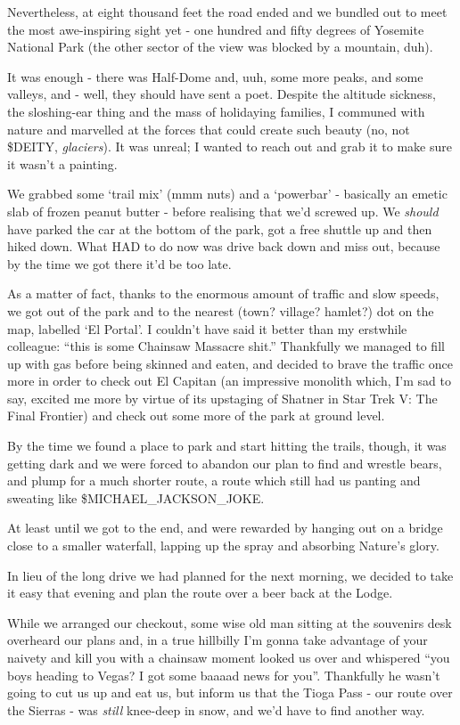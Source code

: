 \documentclass[a5paper,10pt,titlepage,draft]{book}
\begin{document}
Nevertheless, at eight thousand feet the road ended and we bundled out to meet the most awe-inspiring sight yet - one hundred and fifty degrees of Yosemite National Park (the other sector of the view was blocked by a mountain, duh).

It was enough - there was Half-Dome and, uuh, some more peaks, and some valleys, and - well, they should have sent a poet.  Despite the altitude sickness, the sloshing-ear thing and the mass of holidaying families, I communed with nature and marvelled at the forces that could create such beauty (no, not \$DEITY, \emph{glaciers}).  It was unreal; I wanted to reach out and grab it to make sure it wasn't a painting.

We grabbed some `trail mix' (mmm nuts) and a `powerbar' - basically an emetic slab of frozen peanut butter - before realising that we'd screwed up.  We \emph{should} have parked the car at the bottom of the park, got a free shuttle up and then hiked down.  What HAD to do now was drive back down and miss out, because by the time we got there it'd be too late.

As a matter of fact, thanks to the enormous amount of traffic and slow speeds, we got out of the park and to the nearest (town? village? hamlet?) dot on the map, labelled `El Portal'.  I couldn't have said it better than my erstwhile colleague: ``this is some Chainsaw Massacre shit.''  Thankfully we managed to fill up with gas before being skinned and eaten, and decided to brave the traffic once more in order to check out El Capitan (an impressive monolith which, I'm sad to say, excited me more by virtue of its upstaging of Shatner in Star Trek V: The Final Frontier) and check out some more of the park at ground level.

By the time we found a place to park and start hitting the trails, though, it was getting dark and we were forced to abandon our plan to find and wrestle bears, and plump for a much shorter route, a route which still had us panting and sweating like \$MICHAEL\_JACKSON\_JOKE.

At least until we got to the end, and were rewarded by hanging out on a bridge close to a smaller waterfall, lapping up the spray and absorbing Nature's glory.

In lieu of the long drive we had planned for the next morning, we decided to take it easy that evening and plan the route over a beer back at the Lodge.

While we arranged our checkout, some wise old man sitting at the souvenirs desk overheard our plans and, in a true hillbilly I'm gonna take advantage of your naivety and kill you with a chainsaw moment looked us over and whispered ``you boys heading to Vegas? I got some baaaad news for you''.  Thankfully he wasn't going to cut us up and eat us, but inform us that the Tioga Pass - our route over the Sierras - was \emph{still} knee-deep in snow, and we'd have to find another way.
\end{document}
